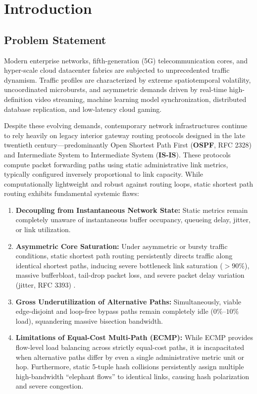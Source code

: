 \documentclass[12pt,a4paper,oneside]{report}
\begin{document}
\clearpage
{}
\setcounter{page}{1}

\chapter{Introduction}
\label{chap:introduction}

\section{Problem Statement}
Modern enterprise networks, fifth-generation (5G) telecommunication cores, and hyper-scale cloud datacenter fabrics are subjected to unprecedented traffic dynamism. Traffic profiles are characterized by extreme spatiotemporal volatility, uncoordinated microbursts, and asymmetric demands driven by real-time high-definition video streaming, machine learning model synchronization, distributed database replication, and low-latency cloud gaming. 

Despite these evolving demands, contemporary network infrastructures continue to rely heavily on legacy interior gateway routing protocols designed in the late twentieth century---predominantly Open Shortest Path First (\textbf{OSPF}, RFC 2328) \cite{moy1998ospf} and Intermediate System to Intermediate System (\textbf{IS-IS}). These protocols compute packet forwarding paths using static administrative link metrics, typically configured inversely proportional to link capacity. While computationally lightweight and robust against routing loops, static shortest path routing exhibits fundamental systemic flaws:
\begin{enumerate}
    \item \textbf{Decoupling from Instantaneous Network State:} Static metrics remain completely unaware of instantaneous buffer occupancy, queueing delay, jitter, or link utilization. 
    \item \textbf{Asymmetric Core Saturation:} Under asymmetric or bursty traffic conditions, static shortest path routing persistently directs traffic along identical shortest paths, inducing severe bottleneck link saturation ($>90\%$), massive bufferbloat, tail-drop packet loss, and severe packet delay variation (jitter, RFC 3393) \cite{deroo2002ip}.
    \item \textbf{Gross Underutilization of Alternative Paths:} Simultaneously, viable edge-disjoint and loop-free bypass paths remain completely idle ($0\%$--$10\%$ load), squandering massive bisection bandwidth.
    \item \textbf{Limitations of Equal-Cost Multi-Path (ECMP):} While ECMP provides flow-level load balancing across strictly equal-cost paths, it is incapacitated when alternative paths differ by even a single administrative metric unit or hop. Furthermore, static 5-tuple hash collisions persistently assign multiple high-bandwidth ``elephant flows'' to identical links, causing hash polarization and severe congestion.
\end{enumerate}
\end{document}
